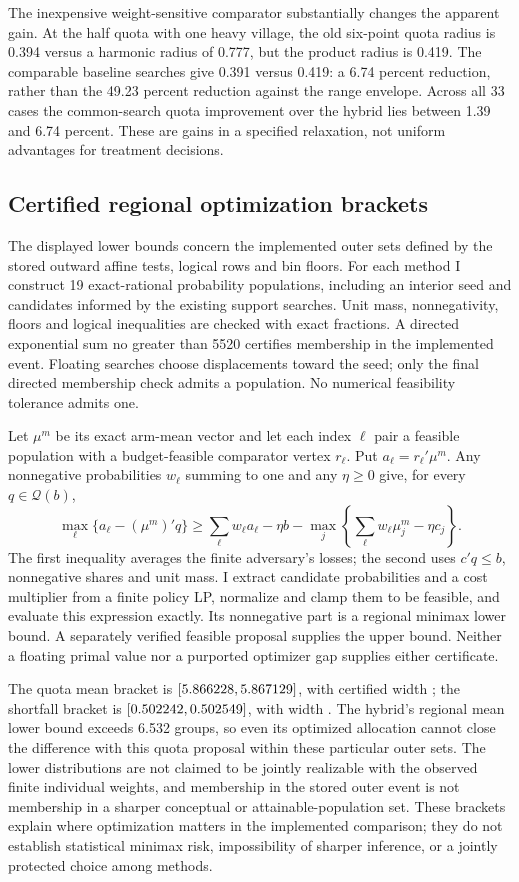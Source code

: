\documentclass[11pt]{article}
\begin{document}
The inexpensive weight-sensitive comparator substantially changes the apparent gain. At the half quota with one heavy village, the old six-point quota radius is 0.394 versus a harmonic radius of 0.777, but the product radius is 0.419. The comparable baseline searches give 0.391 versus 0.419: a 6.74 percent reduction, rather than the 49.23 percent reduction against the range envelope. Across all 33 cases the common-search quota improvement over the hybrid lies between 1.39 and 6.74 percent. These are gains in a specified relaxation, not uniform advantages for treatment decisions.

\subsection{Certified regional optimization brackets}
The displayed lower bounds concern the implemented outer sets defined by the stored outward affine tests, logical rows and bin floors. For each method I construct 19 exact-rational probability populations, including an interior seed and candidates informed by the existing support searches. Unit mass, nonnegativity, floors and logical inequalities are checked with exact fractions. A directed exponential sum no greater than 5520 certifies membership in the implemented event. Floating searches choose displacements toward the seed; only the final directed membership check admits a population. No numerical feasibility tolerance admits one.

Let $\mu^m$ be its exact arm-mean vector and let each index $\ell$ pair a feasible population with a budget-feasible comparator vertex $r_\ell$. Put $a_\ell=r_\ell'\mu^m$. Any nonnegative probabilities $w_\ell$ summing to one and any $\eta\geq0$ give, for every $q\in\mathcal Q(b)$,
\[
 \max_\ell\{a_\ell-(\mu^m)'q\}
 \geq\sum_\ell w_\ell a_\ell-\eta b
 -\max_j\left\{\sum_\ell w_\ell\mu^m_j-\eta c_j\right\}.
\]
The first inequality averages the finite adversary's losses; the second uses $c'q\leq b$, nonnegative shares and unit mass. I extract candidate probabilities and a cost multiplier from a finite policy LP, normalize and clamp them to be feasible, and evaluate this expression exactly. Its nonnegative part is a regional minimax lower bound. A separately verified feasible proposal supplies the upper bound. Neither a floating primal value nor a purported optimizer gap supplies either certificate.

The quota mean bracket is $[5.866228,5.867129]$, with certified width \QuotaRegionalMeanGap; the shortfall bracket is $[0.502242,0.502549]$, with width \QuotaRegionalShortfallGap. The hybrid's regional mean lower bound exceeds 6.532 groups, so even its optimized allocation cannot close the difference with this quota proposal within these particular outer sets. The lower distributions are not claimed to be jointly realizable with the observed finite individual weights, and membership in the stored outer event is not membership in a sharper conceptual or attainable-population set. These brackets explain where optimization matters in the implemented comparison; they do not establish statistical minimax risk, impossibility of sharper inference, or a jointly protected choice among methods.
\end{document}
